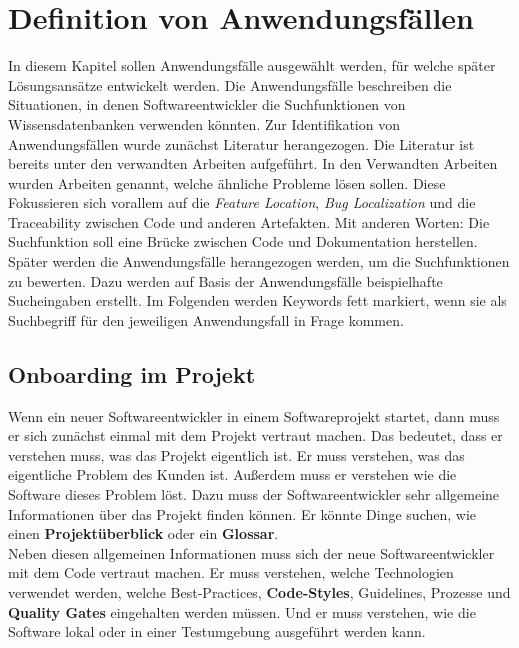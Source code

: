 \chapter{Definition von Anwendungsfällen}
In diesem Kapitel sollen Anwendungsfälle ausgewählt werden, für welche später Lösungsansätze entwickelt werden.
Die Anwendungsfälle beschreiben die Situationen, in denen Softwareentwickler die Suchfunktionen von Wissensdatenbanken verwenden könnten.
Zur Identifikation von Anwendungsfällen wurde zunächst Literatur herangezogen.
Die Literatur ist bereits unter den verwandten Arbeiten aufgeführt.
In den Verwandten Arbeiten wurden Arbeiten genannt, welche ähnliche Probleme lösen sollen.
Diese Fokussieren sich vorallem auf die \textit{Feature Location}, \textit{Bug Localization} und die Traceability zwischen Code und anderen Artefakten.
Mit anderen Worten: Die Suchfunktion soll eine Brücke zwischen Code und Dokumentation herstellen.\\

Später werden die Anwendungsfälle herangezogen werden, um die Suchfunktionen zu bewerten.
Dazu werden auf Basis der Anwendungsfälle beispielhafte Sucheingaben erstellt.
Im Folgenden werden Keywords fett markiert, wenn sie als Suchbegriff für den jeweiligen Anwendungsfall in Frage kommen.\\

\section{Onboarding im Projekt}
Wenn ein neuer Softwareentwickler in einem Softwareprojekt startet, dann muss er sich zunächst einmal mit dem Projekt vertraut machen.
Das bedeutet, dass er verstehen muss, was das Projekt eigentlich ist.
Er muss verstehen, was das eigentliche Problem des Kunden ist.
Außerdem muss er verstehen wie die Software dieses Problem löst.
Dazu muss der Softwareentwickler sehr allgemeine Informationen über das Projekt finden können.
Er könnte Dinge suchen, wie einen \textbf{Projektüberblick} oder ein \textbf{Glossar}.\\

Neben diesen allgemeinen Informationen muss sich der neue Softwareentwickler mit dem Code vertraut machen.
Er muss verstehen, welche Technologien verwendet werden, welche Best-Practices, \textbf{Code-Styles}, Guidelines, Prozesse und \textbf{Quality Gates} eingehalten werden müssen.
Und er muss verstehen, wie die Software lokal oder in einer Testumgebung ausgeführt werden kann.\\

